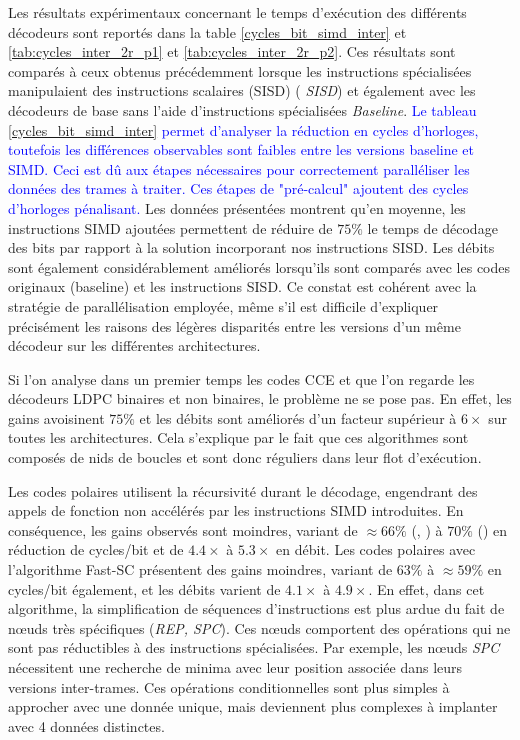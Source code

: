 \documentclass[../main.tex]{subfiles}
\begin{document}
Les résultats expérimentaux concernant le temps d'exécution des différents décodeurs sont reportés dans la table \ref{cycles_bit_simd_inter} et \ref{tab:cycles_inter_2r_p1} et \ref{tab:cycles_inter_2r_p2}.
Ces résultats sont comparés à ceux obtenus précédemment lorsque les instructions spécialisées manipulaient des instructions scalaires (SISD) (\textit{ SISD}) et également avec les décodeurs de base sans l'aide d'instructions spécialisées \textit{ Baseline}.
\textcolor{blue}{Le tableau \ref{cycles_bit_simd_inter} permet d’analyser la réduction en cycles d’horloges, toutefois les différences observables sont faibles entre les versions baseline et SIMD. Ceci est dû aux étapes nécessaires pour correctement paralléliser les données des trames à traiter. Ces étapes de "pré-calcul" ajoutent des cycles d’horloges pénalisant.}
Les données présentées montrent qu'en moyenne, les instructions SIMD ajoutées permettent de réduire de $75\%$ le temps de décodage des bits par rapport à la solution incorporant nos instructions SISD. 
Les débits sont également considérablement améliorés lorsqu'ils sont comparés avec les codes originaux (baseline) et les instructions SISD.
Ce constat est cohérent avec la stratégie de parallélisation employée, même s'il est difficile d'expliquer précisément les raisons des légères disparités entre les versions d'un même décodeur sur les différentes architectures.

Si l'on analyse dans un premier temps les codes CCE et que l'on regarde les décodeurs LDPC binaires et non binaires, le problème ne se pose pas.
En effet, les gains avoisinent $75\%$ et les débits sont améliorés d'un facteur supérieur à $6\times$ sur toutes les architectures. 
Cela s'explique par le fait que ces algorithmes sont composés de nids de boucles et sont donc réguliers dans leur flot d'exécution.

Les codes polaires utilisent la récursivité durant le décodage, engendrant des appels de fonction non accélérés par les instructions SIMD introduites. 
En conséquence, les gains observés sont moindres, variant de $\approx 66\%$ (\IBEX , \RISCY ) à $70\%$ (\SCR) en réduction de cycles/bit et de $4.4\times$ à $5.3\times$ en débit. 
Les codes polaires avec l'algorithme Fast-SC présentent des gains moindres, variant de $63\%$ à $\approx 59\%$ en cycles/bit également, et les débits varient de $4.1\times$ à $4.9\times$. 
En effet, dans cet algorithme, la simplification de séquences d'instructions est plus ardue du fait de nœuds très spécifiques (\textit{REP, SPC}). 
Ces nœuds comportent des opérations qui ne sont pas réductibles à des instructions spécialisées.
Par exemple, les nœuds \textit{SPC} nécessitent une recherche de minima avec leur position associée dans leurs versions inter-trames. 
Ces opérations conditionnelles sont plus simples à approcher avec une donnée unique, mais deviennent plus complexes à implanter avec 4 données distinctes.  
\end{document}
